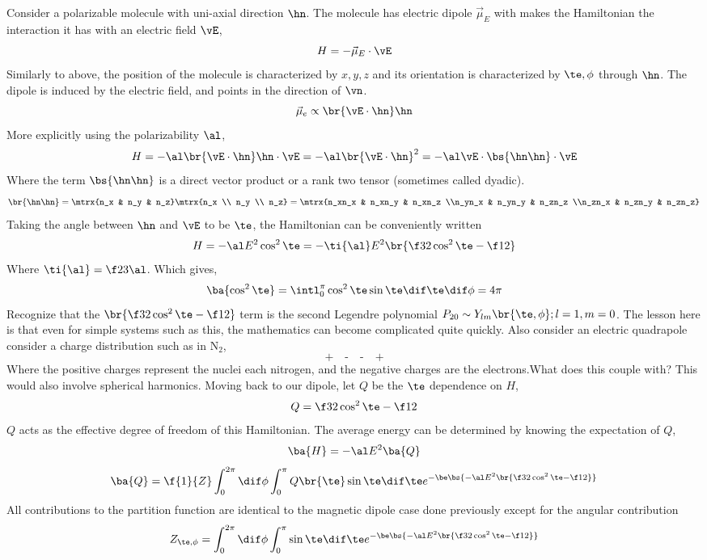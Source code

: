 \documentclass{article}
\begin{document}
Consider a polarizable molecule with uni-axial direction $\hn$. The molecule has electric dipole $\vec{\mu}_E$ with makes the Hamiltonian the interaction it has with an electric field $\vE$,
\[ H = - \vec{\mu}_E \cdot \vE \]
Similarly to above, the position of the molecule is characterized by $x,y,z$ and its orientation is characterized by $\te,\phi$ through $\hn$. The dipole is induced by the electric field, and points in the direction of $\vn$.
\[ \vec{\mu}_e \propto \br{\vE \cdot \hn} \hn \]
 More explicitly using the polarizability $\al$,
\[ H = - \al \br{\vE \cdot \hn} \hn \cdot \vE = - \al \br{\vE \cdot \hn}^2 = -\al \vE \cdot \bs{\hn \hn} \cdot \vE \]
Where the term $\bs{\hn\hn}$ is a direct vector product or a rank two tensor (sometimes called dyadic).
\[ \br{\hn\hn} = \mtrx{n_x & n_y & n_z}\mtrx{n_x \\ n_y \\ n_z} = \mtrx{n_xn_x & n_xn_y & n_xn_z \\n_yn_x & n_yn_y & n_zn_z \\n_zn_x & n_zn_y & n_zn_z} \]
Taking the angle between $\hn$ and $\vE$ to be $\te$, the Hamiltonian can be conveniently written
\[ H = - \al E^2 \cos^2 \te = - \ti{\al} E^2 \br{\f32\cos^2 \te - \f12} \]
Where $\ti{\al} = \f23 \al$. Which gives,
\[ \ba{\cos^2 \te} = \intl_{0}^{\pi} \cos^2 \te \sin \te \dif \te \dif \phi = 4\pi \]
Recognize that the $\br{\f32 \cos^2 \te - \f12}$ term is the second Legendre polynomial $P_{20} \sim Y_{lm}\br{\te, \phi}; l=1,m=0$.
The lesson here is that even for simple systems such as this, the mathematics can become complicated quite quickly. Also consider an electric quadrapole consider a charge distribution such as in $\text{N}_2$,
\[  \textbf{+} \quad \textbf{-} \quad \textbf{-} \quad \textbf{+} \]
Where the positive charges represent the nuclei each nitrogen, and the negative charges are the electrons.What does this couple with? This would also involve spherical harmonics. Moving back to our dipole, let $Q$ be the $\te$ dependence on $H$,
\[ Q = \f32 \cos^2 \te - \f12 \]
$Q$ acts as the effective degree of freedom of this Hamiltonian. The average energy can be determined by knowing the expectation of $Q$,
\[ \ba{H} = - \al E^2 \ba{Q} \]
\[ \ba{Q} = \f{1}{Z}\int_{0}^{2\pi} \dif \phi \int_{0}^{\pi} Q\br{\te}\sin \te \dif \te e^{-\be \bs{-\al E^2 \br{\f32 \cos^2\te - \f12}}} \]
All contributions to the partition function are identical to the magnetic dipole case done previously except for the angular contribution
\[ Z_{\te,\phi} = \int_{0}^{2\pi} \dif \phi \int_{0}^{\pi} \sin \te \dif \te e^{-\be \bs{-\al E^2 \br{\f32 \cos^2\te - \f12}}} \]
\end{document}
